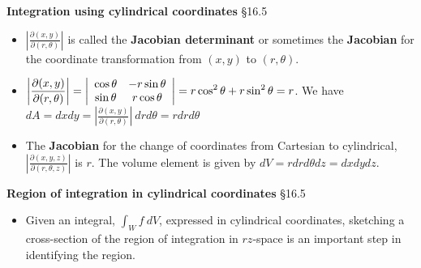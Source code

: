 \documentclass[12pt,letterpaper,noanswers]{exam}
\begin{document}
    \noindent\textbf{Integration using cylindrical coordinates} \S 16.5
    \begin{tcolorbox}
    \begin{itemize}
    \item $\displaystyle\left\vert \frac{\partial(x,y)}{\partial(r,\theta)}\right\vert$ is called the \textbf{Jacobian determinant} or sometimes the \textbf{Jacobian} for the coordinate transformation from $(x,y)$ to $(r,\theta)$.
    \item $\displaystyle\left\vert \frac{\partial(x,y)}{\partial(r,\theta)}\right\vert = \left\vert\begin{array}{c c} \cos\theta & -r\sin\theta \\ \sin\theta & r\cos\theta \end{array}\right\vert = r\cos^2\theta + r\sin^2\theta = r$.  We have $dA = dxdy = \displaystyle\left\vert \frac{\partial(x,y)}{\partial(r,\theta)}\right\vert\ drd\theta = rdrd\theta$
    \item The \textbf{Jacobian} for the change of coordinates from Cartesian to cylindrical, $\displaystyle\left\vert\frac{\partial(x,y,z)}{\partial(r,\theta,z)}\right\vert$ is $r$.  The volume element is given by $dV = rdrd\theta dz = dxdydz$.
\end{itemize}


\end{tcolorbox}





\noindent\textbf{Region of integration in cylindrical coordinates} \S 16.5
\begin{tcolorbox}
\begin{itemize}
\itemsep0em
    \item Given an integral, $\int_W f\ dV$, expressed in cylindrical coordinates, sketching a cross-section of the region of integration in  $rz$-space is an important step in identifying the region. 
\end{itemize}


\end{tcolorbox}
\end{document}
